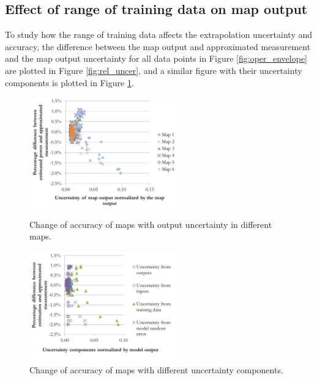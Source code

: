 \subsection{Effect of range of training data on map output} \label{subsec:comp_uncer}

To study how the range of training data affects the extrapolation uncertainty and accuracy, the difference between the map output and approximated measurement and the map output uncertainty for all data points in Figure \ref{fig:oper_envelope} are plotted in Figure \ref{fig:rel_uncer}, and a similar figure with their uncertainty components is plotted in Figure \ref{fig:uncer_comp}.

\begin{figure}[h]
\begin{minipage}{15pc}
\includegraphics[width=15pc]{rel_diff_to_rel_uncer.pdf}
\caption{\label{fig:rel_uncer}Change of accuracy of maps with output uncertainty in different maps.}
\end{minipage}\hspace{2pc}%
\begin{minipage}{15pc}
\includegraphics[width=15pc]{rel_diff_to_uncer_comp.pdf}
\caption{\label{fig:uncer_comp}Change of accuracy of maps with different uncertainty components.}
\end{minipage} 
\end{figure}

